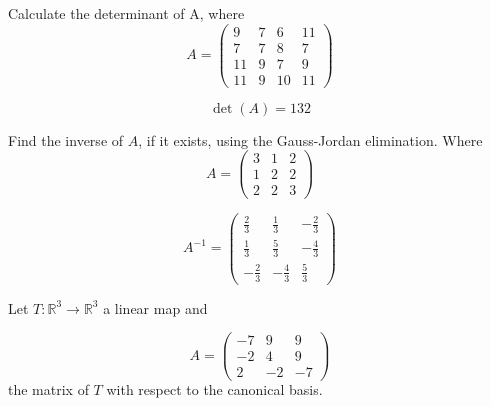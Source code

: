 \begin{questions}

\question Calculate the determinant of A, where
$$
A=\left(\begin{array}{rrrr}
9 & 7 & 6 & 11 \\
7 & 7 & 8 & 7 \\
11 & 9 & 7 & 9 \\
11 & 9 & 10 & 11
\end{array}\right)
$$

\begin{solution}
$$\det(A)=132$$
\end{solution}

\question Find the inverse of $A$, if it exists, using the Gauss-Jordan elimination. Where
$$
A=\left(\begin{array}{rrr}
3 & 1 & 2 \\
1 & 2 & 2 \\
2 & 2 & 3
\end{array}\right)
$$

\begin{solution}
$$A^{-1}=\left(\begin{array}{rrr}
\frac{2}{3} & \frac{1}{3} & -\frac{2}{3} \\
\frac{1}{3} & \frac{5}{3} & -\frac{4}{3} \\
-\frac{2}{3} & -\frac{4}{3} & \frac{5}{3}
\end{array}\right)$$
\end{solution}

\question Let $T:\mathbb{R}^3\rightarrow\mathbb{R}^3$  a linear map and
 
$$
A=\left(\begin{array}{rrr}
-7 & 9 & 9 \\
-2 & 4 & 9 \\
2 & -2 & -7
\end{array}\right)
$$
the matrix of $T$ with respect to the canonical basis.
\end{questions}
